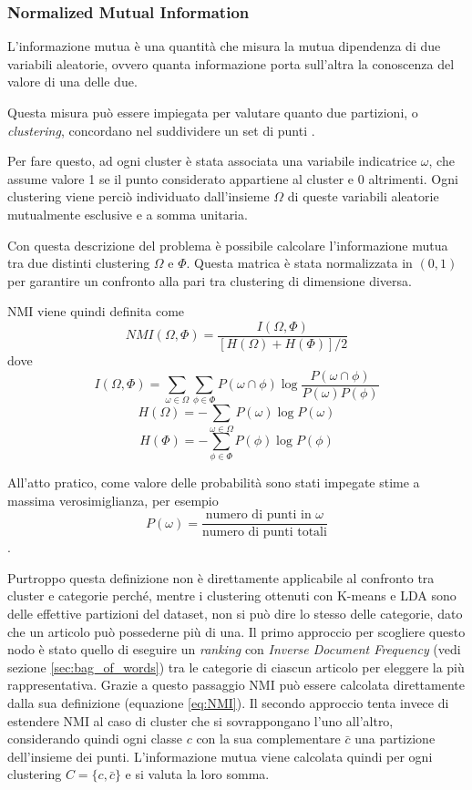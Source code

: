 \documentclass[
	11pt, %
	a4paper, %
	oneside, %
	headinclude,footinclude, %
	BCOR5mm, %
]{scrartcl}
\begin{document}
		\subsubsection{Normalized Mutual Information} \label{sec:NMI}
			L'informazione mutua è una quantità che misura la mutua dipendenza di due variabili aleatorie, ovvero quanta informazione porta sull'altra la conoscenza del valore di una delle due.

			Questa misura può essere impiegata per valutare quanto due partizioni, o \emph{clustering}, concordano nel suddividere un set di punti \cite{Manning}.

			Per fare questo, ad ogni cluster è stata associata una variabile indicatrice $\omega$, che assume valore 1 se il punto considerato appartiene al cluster e 0 altrimenti.
			Ogni clustering viene perciò individuato dall'insieme $\Omega$ di queste variabili aleatorie mutualmente esclusive e a somma unitaria.

			Con questa descrizione del problema è possibile calcolare l'informazione mutua tra due distinti clustering $\Omega$ e $\Phi$.
			Questa matrica è stata normalizzata in $(0, 1)$ per garantire un confronto alla pari tra clustering di dimensione diversa.

			NMI viene quindi definita come
			\begin{equation} \label{eq:NMI}
				NMI(\Omega, \Phi) = \frac
					{I(\Omega, \Phi)}
					{\left[ H(\Omega) + H(\Phi)\right] / 2}
			\end{equation}
			dove
			$$ I(\Omega, \Phi) =
					\sum_{\omega \in \Omega} \sum_{\phi \in \Phi}
						P(\omega \cap \phi) \log \frac {P(\omega \cap \phi)} {P(\omega) P(\phi)} $$
			$$ H(\Omega) = - \sum_{\omega \in \Omega} P(\omega) \log P(\omega) $$
				$$ H(\Phi) = - \sum_{\phi \in \Phi} P(\phi) \log P(\phi) $$

			All'atto pratico, come valore delle probabilità sono stati impegate stime a massima verosimiglianza, per esempio
			\begin{equation*}
				P(\omega) = \frac
					{ \text{numero di punti in }\omega }
					{ \text{numero di punti totali} }
			\end{equation*}.

			\smallbreak

			Purtroppo questa definizione non è direttamente applicabile al confronto tra cluster e categorie perché, mentre i clustering ottenuti con K-means e LDA sono delle effettive partizioni del dataset, non si può dire lo stesso delle categorie, dato che un articolo può possederne più di una.
			\smallbreak
			Il primo approccio per scogliere questo nodo è stato quello di eseguire un \emph{ranking} con \emph{Inverse Document Frequency} (vedi sezione \ref{sec:bag_of_words}) tra le categorie di ciascun articolo per eleggere la più rappresentativa.
			Grazie a questo passaggio NMI può essere calcolata direttamente dalla sua definizione (equazione \ref{eq:NMI}).
			\smallbreak
			Il secondo approccio tenta invece di estendere NMI al caso di cluster che si sovrappongano l'uno all'altro, considerando quindi ogni classe $c$ con la sua complementare $\bar{c}$ una partizione dell'insieme dei punti.
			L'informazione mutua viene calcolata quindi per ogni clustering $C = \{c, \bar{c}\}$ e si valuta la loro somma.
			
\end{document}
